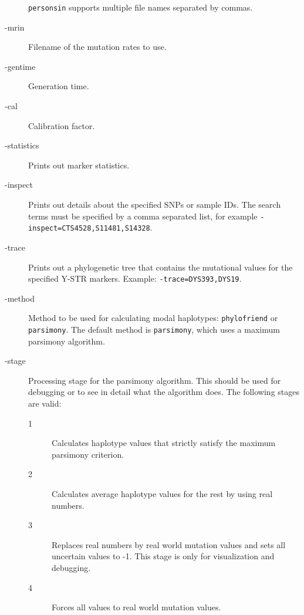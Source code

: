 \begin{description}
	\texttt{personsin} supports multiple file names separated by
	commas.
\item[-mrin] Filename of the mutation rates to use.
\item[-gentime] Generation time.
\item[-cal] Calibration factor.
\item[-statistics] Prints out marker statistics.
\item[-inspect] Prints out details about the specified SNPs or
	sample IDs. The search terms must be specified by a comma
	separated list, for example \texttt{-inspect=CTS4528,S11481,S14328}.
\item[-trace] Prints out a phylogenetic tree that contains the
	mutational values for the specified Y-STR markers. Example:
	\texttt{-trace=DYS393,DYS19}.
\item[-method] Method to be used for calculating modal haplotypes:
	\texttt{phylofriend} or \texttt{parsimony}. The default method
	is \texttt{parsimony}, which uses a maximum parsimony algorithm.
\item[-stage] Processing stage for the parsimony algorithm. This
	should be used for debugging or to see in detail what the algorithm
	does. The following stages are valid:
	\begin{description}
	\item[1] Calculates haplotype values that strictly satisfy
		the maximum parsimony criterion.
	\item[2] Calculates average haplotype values for the rest
		by using real numbers.
	\item[3] Replaces real numbers by real world mutation values
		and sets all uncertain values to -1.
		This stage is only for visualization and debugging.
	\item[4] Forces all values to real world mutation values.
	\end{description}
\end{description}

